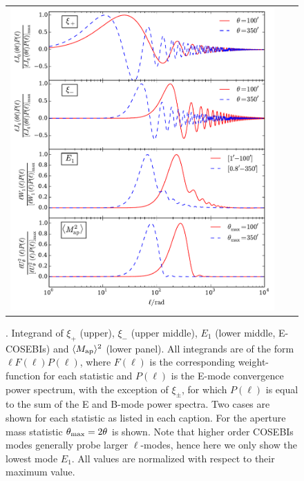 \begin{figure}[!htp]
\begin{center}
\begin{tabular}{ccc}
\includegraphics[width=\textwidth]{figures/IntegAll.pdf} \\
\end{tabular}
\caption{ \small{\label{fig:filters}. Integrand of $\xi_+$ (upper), $\xi_-$ (upper middle), $E_1$ (lower middle, E-COSEBIs) and $\langle M_{\rm ap} \rangle^2$ (lower panel).
All integrands are of the form $\ell F(\ell) P(\ell)$, where $F(\ell)$ is the corresponding weight-function
for each statistic and $P(\ell)$ is the E-mode convergence power spectrum, with the exception of $\xi_\pm$, for which
$P(\ell)$ is equal to the sum of the E and B-mode power spectra. 
Two cases are shown for each statistic as listed in each caption.
For the aperture mass statistic $\theta_{\rm max}=2\theta$ is shown. 
Note that higher order COSEBIs modes generally probe larger $\ell$-modes, 
hence here we only show the lowest mode $E_1$. All values are normalized with respect to their maximum value. }
}
\end{center}
\end{figure}

